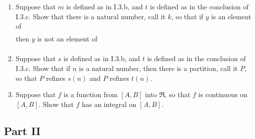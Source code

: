 \documentclass{article}
\begin{document}
\begin{itemize}
\begin{enumerate}[\hspace{1cm}(a.)]
\begin{enumerate}[\hspace{1cm}(i.)]
        \end{enumerate}

      \item Suppose that $m$ is defined as in I.3.b, and $t$ is defined as in the conclusion of I.3.c. Show that there is a natural number, call it $k$, so that if $y$ is an element of 
        \begin{align*}
          [ \ & \min \{ x \ : \ \text{there is an interpolating sequence for $s(k)$,} 
          \\ & \quad \text{call it $Q$, so that $x = S_{f, s(k), Q}$} \},
          \\ & \max \{ x \ : \ \text{there is an interpolating sequence for $s(k)$, } 
          \\ & \quad \text{call it $Q$, so that $x = S_{f, s(k), Q}$} \} \ ]
        \end{align*}
        then $y$ is not an element of
        \begin{align*}
          [ \ & \min \{ x \ : \ \text{there is an interpolating sequence for $t(k)$, } 
          \\ & \quad \text{call it $Q$, so that $x = S_{f, t(k), Q}$} \},
          \\ & \max \{ x \ : \ \text{there is an interpolating sequence for $t(n)$, } 
          \\ & \quad \text{call it $Q$, so that $x = S_{f, t(n), Q}$} \} \ ]
        \end{align*}

      \item Suppose that $s$ is defined as in I.3.b, and $t$ is defined as in the conclusion of I.3.c. Show that if $n$ is a natural number, then there is a partition, call it $P$, so that $P$ refines $s(n)$ and $P$ refines $t(n)$.

      \item Suppose that $f$ is a function from $[A,B]$ into $\Re$, so that $f$ is continuous on $[A,B]$. Show that $f$ has an integral on $[A,B]$.

    \end{enumerate}

\end{itemize}  

\subsection*{Part II}
\end{document}
